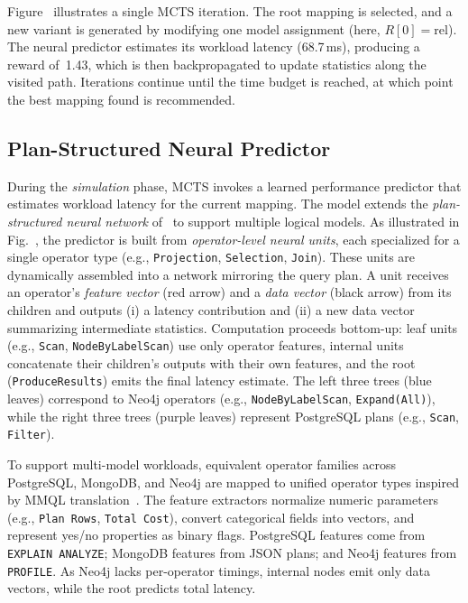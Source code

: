 \begin{example}
Figure~ illustrates a single MCTS iteration. The root mapping is selected, and a new variant is generated by modifying one model assignment (here, $R[0] = \text{rel}$). The neural predictor estimates its workload latency (68.7\,ms), producing a reward of~1.43, which is then backpropagated to update statistics along the visited path. Iterations continue until the time budget is reached, at which point the best mapping found is recommended.
\end{example}

\subsection{Plan-Structured Neural Predictor}
During the \emph{simulation} phase, MCTS invokes a learned performance predictor that estimates workload latency for the current mapping. The model extends the \textit{plan-structured neural network} of~\citep{10.14778/3342263.3342646} to support multiple logical models. As illustrated in Fig.~, the predictor is built from \emph{operator-level neural units}, each specialized for a single operator type (e.g., \texttt{Projection}, \texttt{Selection}, \texttt{Join}). These units are dynamically assembled into a network mirroring the query plan. A unit receives an operator's \emph{feature vector} (red arrow) and a \emph{data vector} (black arrow) from its children and outputs (i) a latency contribution and (ii) a new data vector summarizing intermediate statistics. Computation proceeds bottom-up: leaf units (e.g., \texttt{Scan}, \texttt{NodeByLabelScan}) use only operator features, internal units concatenate their children's outputs with their own features, and the root (\texttt{ProduceResults}) emits the final latency estimate. The left three trees (blue leaves) correspond to Neo4j operators (e.g., \texttt{NodeByLabelScan}, \texttt{Expand(All)}), while the right three trees (purple leaves) represent PostgreSQL plans (e.g., \texttt{Scan}, \texttt{Filter}).

To support multi-model workloads, equivalent operator families across PostgreSQL, MongoDB, and Neo4j are mapped to unified operator types inspired by MMQL translation~\citep{koupil2023universal}. The feature extractors normalize numeric parameters (e.g., \texttt{Plan Rows}, \texttt{Total Cost}), convert categorical fields into vectors, and represent yes/no properties as binary flags. PostgreSQL features come from \texttt{EXPLAIN ANALYZE}; MongoDB features from JSON plans; and Neo4j features from \texttt{PROFILE}. As Neo4j lacks per-operator timings, internal nodes emit only data vectors, while the root predicts total latency.

